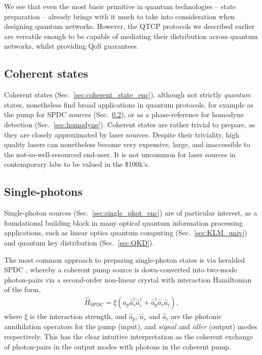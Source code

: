 We see that even the most basic primitive in quantum technologies -- state preparation -- already brings with it much to take into consideration when designing quantum networks. However, the QTCP protocols we described earlier are versatile enough to be capable of mediating their distribution across quantum networks, whilst providing QoS guarantees.

%
%

\subsection{Coherent states} \label{sec:coherent_states} 

Coherent states (Sec.~\ref{sec:coherent_state_enc}), although not strictly \textit{quantum} states, nonetheless find broad applications in quantum protocols, for example as the pump for SPDC sources (Sec.~\ref{sec:single_phot_src}), or as a phase-reference for homodyne detection (Sec.~\ref{sec:homodyne}). Coherent states are rather trivial to prepare, as they are closely approximated by laser sources. Despite their triviality, high quality lasers can nonetheless become very expensive, large, and inaccessible to the not-so-well-resourced end-user. It is not uncommon for laser sources in contemporary labs to be valued in the \$100k's.

%
%

\subsection{Single-photons} \label{sec:single_phot_src} 

Single-photon sources (Sec.~\ref{sec:single_phot_enc}) \cite{bib:Oxborrow05} are of particular interest, as a foundational building block in many optical quantum information processing applications, such as linear optics quantum computing (Sec.~\ref{sec:KLM_univ}) and quantum key distribution (Sec.~\ref{sec:QKD}).

The most common approach to preparing single-photon states is via heralded SPDC \cite{bib:URen03, bib:URen05}, whereby a coherent pump source is down-converted into two-mode photon-pairs via a second-order non-linear crystal with interaction Hamiltonian of the form,
\begin{align}
\hat{H}_\mathrm{SPDC} = \xi(\hat{a}_p\hat{a}_s^\dag\hat{a}_i^\dag + \hat{a}_p^\dag\hat{a}_s\hat{a}_i),
\end{align}
where $\xi$ is the interaction strength, and $\hat{a}_p$, $\hat{a}_s$ and $\hat{a}_i$ are the photonic annihilation operators for the pump (input), and \textit{signal} and \textit{idler} (output) modes respectively. This has the clear intuitive interpretation as the coherent exchange of photon-pairs in the output modes with photons in the coherent pump.

